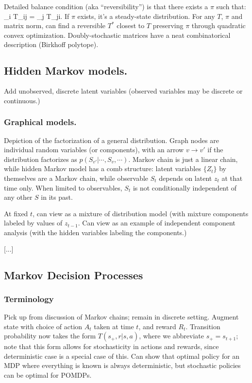 \documentclass[notitlepage,openany,11pt]{report}
\theoremstyle{plain}%
\numberwithin{equation}{section}
\begin{document}
Detailed balance condition (aka ``reversibility'') is that there exists a $\pi$ such that:
\be
\pi_{i} T_{ij} = \pi_{j} T_{ji}.
\ee
If $\pi$ exists, it's a steady-state distribution. For any $T$, $\pi$ and matrix norm, can find a reversible $T^{\ast}$ closest to $T$ preserving $\pi$ through quadratic convex optimization. Doubly-stochastic matrices have a neat combinatorical description (Birkhoff polytope).



\subsection{Hidden Markov models.} 
\label{sec-hidden-markov-models}

Add unobserved, discrete latent variables (observed variables may be discrete or continuous.)

\subsubsection{Graphical models.} Depiction of the factorization of a general distribution. Graph nodes are individual random variables (or components), with an arrow $v \to v'$ if the distribution factorizes as $p(S_{v'} | \cdots, S_{v}, \cdots)$. Markov chain is just a linear chain, while hidden Markov model has a comb structure: latent variables $\{Z_{t} \}$ by themselves are a Markov chain, while observable $S_{t}$ depends on latent $z_{t}$ at that time only. When limited to observables, $S_{t}$ is not conditionally independent of any other $S$ in its past.

At fixed $t$, can view as a mixture of distribution model (with mixture components labeled by values of $z_{t-1}$. Can view as an example of independent component analysis (with the hidden variables labeling the components.) 



[...]


\subsection{Markov Decision Processes} 

\subsubsection{Terminology} Pick up from discussion of Markov chains; remain in discrete setting. Augment state with choice of action $A_{t}$ taken at time $t$, and reward $R_{t}$. Transition probability now takes the form $T(s_{+}, r | s, a)$, where we abbreviate $s_{+} = s_{t+1}$; note that this form allows for stochasticity in actions and rewards, since deterministic case is a special case of this. Can show that optimal policy for an MDP where everything is known is always deterministic, but stochastic policies can be optimal for POMDPs. 
\end{document}
